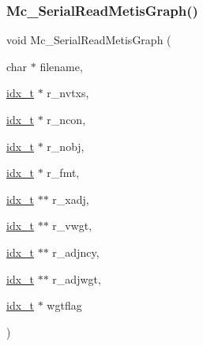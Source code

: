 \subsubsection{\texorpdfstring{Mc\+\_\+\+Serial\+Read\+Metis\+Graph()}{Mc\_SerialReadMetisGraph()}}
{\footnotesize\ttfamily void Mc\+\_\+\+Serial\+Read\+Metis\+Graph (\begin{DoxyParamCaption}\item[{char $\ast$}]{filename,  }\item[{\hyperlink{a00876_aaa5262be3e700770163401acb0150f52}{idx\+\_\+t} $\ast$}]{r\+\_\+nvtxs,  }\item[{\hyperlink{a00876_aaa5262be3e700770163401acb0150f52}{idx\+\_\+t} $\ast$}]{r\+\_\+ncon,  }\item[{\hyperlink{a00876_aaa5262be3e700770163401acb0150f52}{idx\+\_\+t} $\ast$}]{r\+\_\+nobj,  }\item[{\hyperlink{a00876_aaa5262be3e700770163401acb0150f52}{idx\+\_\+t} $\ast$}]{r\+\_\+fmt,  }\item[{\hyperlink{a00876_aaa5262be3e700770163401acb0150f52}{idx\+\_\+t} $\ast$$\ast$}]{r\+\_\+xadj,  }\item[{\hyperlink{a00876_aaa5262be3e700770163401acb0150f52}{idx\+\_\+t} $\ast$$\ast$}]{r\+\_\+vwgt,  }\item[{\hyperlink{a00876_aaa5262be3e700770163401acb0150f52}{idx\+\_\+t} $\ast$$\ast$}]{r\+\_\+adjncy,  }\item[{\hyperlink{a00876_aaa5262be3e700770163401acb0150f52}{idx\+\_\+t} $\ast$$\ast$}]{r\+\_\+adjwgt,  }\item[{\hyperlink{a00876_aaa5262be3e700770163401acb0150f52}{idx\+\_\+t} $\ast$}]{wgtflag }\end{DoxyParamCaption})}

